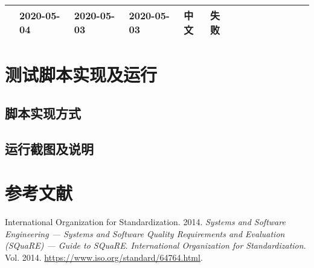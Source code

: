 \documentclass[hyperref, a4paper]{ctexart}
\begin{document}
\begin{longtable}[]{@{}llllllllllllll@{}}
\begin{minipage}[t]{0.05\columnwidth}
\end{minipage} & \begin{minipage}[t]{0.05\columnwidth}\raggedright
2020-05-04\strut
\end{minipage} & \begin{minipage}[t]{0.08\columnwidth}\raggedright
2020-05-03\strut
\end{minipage} & \begin{minipage}[t]{0.08\columnwidth}\raggedright
2020-05-03\strut
\end{minipage} & \begin{minipage}[t]{0.04\columnwidth}\raggedright
中文\strut
\end{minipage} & \begin{minipage}[t]{0.02\columnwidth}\raggedright
失败\strut
\end{minipage}\tabularnewline
\bottomrule
\end{longtable}

\hypertarget{ux6d4bux8bd5ux811aux672cux5b9eux73b0ux53caux8fd0ux884c}{%
\section{测试脚本实现及运行}\label{ux6d4bux8bd5ux811aux672cux5b9eux73b0ux53caux8fd0ux884c}}

\hypertarget{ux811aux672cux5b9eux73b0ux65b9ux5f0f}{%
\subsection{脚本实现方式}\label{ux811aux672cux5b9eux73b0ux65b9ux5f0f}}

\hypertarget{ux8fd0ux884cux622aux56feux53caux8bf4ux660e}{%
\subsection{运行截图及说明}\label{ux8fd0ux884cux622aux56feux53caux8bf4ux660e}}

\pagebreak

\hypertarget{ux53c2ux8003ux6587ux732e}{%
\section*{参考文献}\label{ux53c2ux8003ux6587ux732e}}

\hypertarget{refs}{}
\leavevmode\hypertarget{ref-innovativeInternationalisation}{}%
International Organization for Standardization. 2014. \emph{Systems and
Software Engineering --- Systems and Software Quality Requirements and
Evaluation (SQuaRE) --- Guide to SQuaRE}. \emph{International
Organization for Standardization}. Vol. 2014.
\url{https://www.iso.org/standard/64764.html}.
\end{document}

